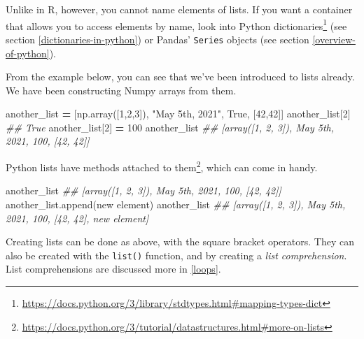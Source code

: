 \documentclass[
  12pt,
  krantz2]{krantz}
\makeatletter
\newenvironment{Shaded}{\begin{snugshade}}{\end{snugshade}}
\newcommand{\CommentTok}[1]{\textcolor[rgb]{0.37,0.37,0.37}{\textit{#1}}}
\newcommand{\DecValTok}[1]{\textcolor[rgb]{0.06,0.06,0.06}{#1}}
\newcommand{\NormalTok}[1]{#1}
\newcommand{\OperatorTok}[1]{\textcolor[rgb]{0.43,0.43,0.43}{\textbf{#1}}}
\newcommand{\StringTok}[1]{\textcolor[rgb]{0.5,0.5,0.5}{#1}}
\newcommand{\VariableTok}[1]{\textcolor[rgb]{0,0,0}{#1}}
\renewcommand{\href}[2]{#2\footnote{\url{#1}}}
\newenvironment{kframe}{%
\medskip{}
\setlength{\fboxsep}{.8em}
 \def\at@end@of@kframe{}%
 \ifinner\ifhmode%
  \def\at@end@of@kframe{\end{minipage}}%
  \begin{minipage}{\columnwidth}%
 \fi\fi%
 \def\FrameCommand##1{\hskip\@totalleftmargin \hskip-\fboxsep
 \colorbox{shadecolor}{##1}\hskip-\fboxsep
     \hskip-\linewidth \hskip-\@totalleftmargin \hskip\columnwidth}%
 \MakeFramed {\advance\hsize-\width
   \@totalleftmargin\z@ \linewidth\hsize
   \@setminipage}}%
 {\par\unskip\endMakeFramed%
 \at@end@of@kframe}
\renewenvironment{Shaded}{\begin{kframe}}{\end{kframe}}
\makeatother
\begin{document}
Unlike in R, however, you cannot name elements of lists. If you want a container that allows you to access elements by name, look into Python \href{https://docs.python.org/3/library/stdtypes.html\#mapping-types-dict}{dictionaries} (see section \ref{dictionaries-in-python}) or Pandas' \texttt{Series} objects (see section \ref{overview-of-python}).

From the example below, you can see that we've been introduced to lists already. We have been constructing Numpy arrays from them.

\begin{Shaded}
\begin{Highlighting}[]
\NormalTok{another\_list }\OperatorTok{=}\NormalTok{ [np.array([}\DecValTok{1}\NormalTok{,}\DecValTok{2}\NormalTok{,}\DecValTok{3}\NormalTok{]), }\StringTok{"May 5th, 2021"}\NormalTok{, }\VariableTok{True}\NormalTok{, [}\DecValTok{42}\NormalTok{,}\DecValTok{42}\NormalTok{]]}
\NormalTok{another\_list[}\DecValTok{2}\NormalTok{]}
\CommentTok{\#\# True}
\NormalTok{another\_list[}\DecValTok{2}\NormalTok{] }\OperatorTok{=} \DecValTok{100}
\NormalTok{another\_list}
\CommentTok{\#\# [array([1, 2, 3]), \textquotesingle{}May 5th, 2021\textquotesingle{}, 100, [42, 42]]}
\end{Highlighting}
\end{Shaded}

Python lists have \href{https://docs.python.org/3/tutorial/datastructures.html\#more-on-lists}{methods attached to them}, which can come in handy.

\begin{Shaded}
\begin{Highlighting}[]
\NormalTok{another\_list}
\CommentTok{\#\# [array([1, 2, 3]), \textquotesingle{}May 5th, 2021\textquotesingle{}, 100, [42, 42]]}
\NormalTok{another\_list.append(}\StringTok{\textquotesingle{}new element\textquotesingle{}}\NormalTok{)}
\NormalTok{another\_list}
\CommentTok{\#\# [array([1, 2, 3]), \textquotesingle{}May 5th, 2021\textquotesingle{}, 100, [42, 42], \textquotesingle{}new element\textquotesingle{}]}
\end{Highlighting}
\end{Shaded}

Creating lists can be done as above, with the square bracket operators. They can also be created with the \texttt{list()} function, and by creating a \emph{list comprehension}. List comprehensions are discussed more in \ref{loops}.
\end{document}

